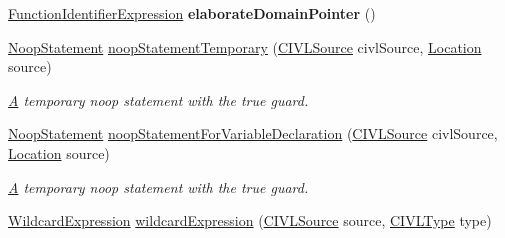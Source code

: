 \begin{DoxyCompactItemize}
\item 
\hypertarget{classedu_1_1udel_1_1cis_1_1vsl_1_1civl_1_1model_1_1common_1_1CommonModelFactory_a18cee0a57f13c724eb83e7268de3607a}{}\hyperlink{interfaceedu_1_1udel_1_1cis_1_1vsl_1_1civl_1_1model_1_1IF_1_1expression_1_1FunctionIdentifierExpression}{Function\+Identifier\+Expression} {\bfseries elaborate\+Domain\+Pointer} ()\label{classedu_1_1udel_1_1cis_1_1vsl_1_1civl_1_1model_1_1common_1_1CommonModelFactory_a18cee0a57f13c724eb83e7268de3607a}

\item 
\hyperlink{interfaceedu_1_1udel_1_1cis_1_1vsl_1_1civl_1_1model_1_1IF_1_1statement_1_1NoopStatement}{Noop\+Statement} \hyperlink{classedu_1_1udel_1_1cis_1_1vsl_1_1civl_1_1model_1_1common_1_1CommonModelFactory_ad5a6127eaa92a8dd3ea7a323e4242cb5}{noop\+Statement\+Temporary} (\hyperlink{interfaceedu_1_1udel_1_1cis_1_1vsl_1_1civl_1_1model_1_1IF_1_1CIVLSource}{C\+I\+V\+L\+Source} civl\+Source, \hyperlink{interfaceedu_1_1udel_1_1cis_1_1vsl_1_1civl_1_1model_1_1IF_1_1location_1_1Location}{Location} source)
\begin{DoxyCompactList}\small\item\em \hyperlink{structA}{A} temporary noop statement with the true guard. \end{DoxyCompactList}\item 
\hyperlink{interfaceedu_1_1udel_1_1cis_1_1vsl_1_1civl_1_1model_1_1IF_1_1statement_1_1NoopStatement}{Noop\+Statement} \hyperlink{classedu_1_1udel_1_1cis_1_1vsl_1_1civl_1_1model_1_1common_1_1CommonModelFactory_a6db1c06507ca0c0aa4a4a59c0df11c01}{noop\+Statement\+For\+Variable\+Declaration} (\hyperlink{interfaceedu_1_1udel_1_1cis_1_1vsl_1_1civl_1_1model_1_1IF_1_1CIVLSource}{C\+I\+V\+L\+Source} civl\+Source, \hyperlink{interfaceedu_1_1udel_1_1cis_1_1vsl_1_1civl_1_1model_1_1IF_1_1location_1_1Location}{Location} source)
\begin{DoxyCompactList}\small\item\em \hyperlink{structA}{A} temporary noop statement with the true guard. \end{DoxyCompactList}\item 
\hyperlink{interfaceedu_1_1udel_1_1cis_1_1vsl_1_1civl_1_1model_1_1IF_1_1expression_1_1WildcardExpression}{Wildcard\+Expression} \hyperlink{classedu_1_1udel_1_1cis_1_1vsl_1_1civl_1_1model_1_1common_1_1CommonModelFactory_af4e69a38f7b9e79ffaf24753e43b789b}{wildcard\+Expression} (\hyperlink{interfaceedu_1_1udel_1_1cis_1_1vsl_1_1civl_1_1model_1_1IF_1_1CIVLSource}{C\+I\+V\+L\+Source} source, \hyperlink{interfaceedu_1_1udel_1_1cis_1_1vsl_1_1civl_1_1model_1_1IF_1_1type_1_1CIVLType}{C\+I\+V\+L\+Type} type)

\end{DoxyCompactItemize}
